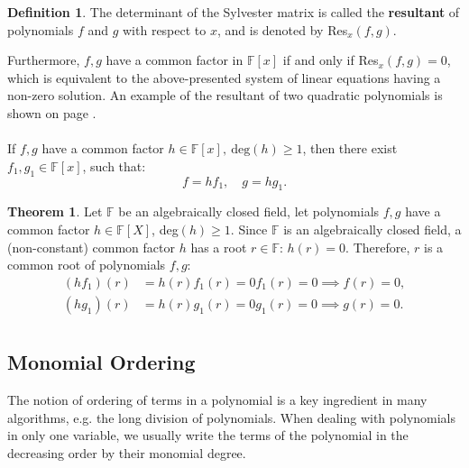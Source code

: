\documentclass[thesis=M,english]{FITthesis}[2012/10/20]
\theoremstyle{remark}
\theoremstyle{definition}
\newtheorem{DF}{Definition}[section]
\newtheorem{theorem}{Theorem}[section]
\begin{document}
\begin{DF}
\noindent The determinant of the Sylvester matrix is called the \textbf{resultant} of polynomials $f$ and $g$ with respect to $x$, and is denoted by Res$_{x}(f,g)$.
\end{DF}
\noindent Furthermore, $f,g$ have a common factor in $\mathbb{F}[x]$ if and only if Res$_x(f,g) = 0$, which is equivalent to the above-presented system of linear equations having a non-zero solution. An example of the resultant of two quadratic polynomials is shown on page \pageref{resExample}. 
\\ \\
\noindent If $f,g$ have a common factor $h \in \mathbb{F}[x],\ \text{deg}(h) \geq 1$, then there exist ${f_1, g_1 \in \mathbb{F}[x]}$, such that:
$$
f = hf_1, \quad g = hg_1.
$$
\begin{theorem}
\noindent Let $\mathbb{F}$ be an algebraically closed field, let polynomials $f,g$ have a common factor $h \in \mathbb{F}[X]$, deg$(h) \geq 1$. Since $\mathbb{F}$ is an algebraically closed field, a (non-constant) common factor $h$ has a root ${r \in \mathbb{F}}$: ${h(r) = 0}$. Therefore, $r$ is a common root of polynomials $f,g$:
\begin{align*}
(hf_1)(r) &= h(r)f_1(r) = 0f_1(r) = 0 \implies f(r) = 0 ,\\
(hg_1)(r) &= h(r)g_1(r) = 0g_1(r) = 0 \implies g(r) = 0.\\
\end{align*}
\end{theorem}
\subsection{Monomial Ordering}
\noindent The notion of ordering of terms in a polynomial is a key ingredient in many algorithms, e.g. the long division of polynomials. When dealing with polynomials in only one variable, we usually write the terms of the polynomial in the decreasing order by their monomial degree. \\ \\
\end{document}
